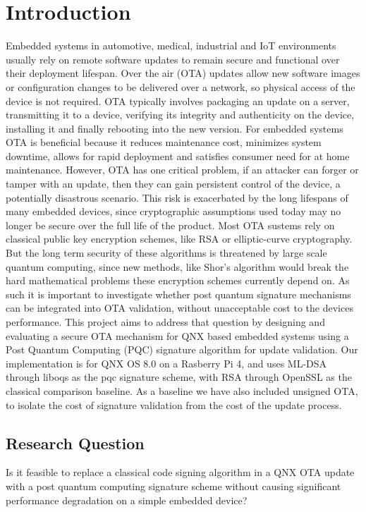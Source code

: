 \documentclass[12pt]{article}
\begin{document}
\section{Introduction}
Embedded systems in automotive, medical, industrial and IoT environments usually rely on remote software updates to remain secure and functional over their deployment lifespan. Over the air (OTA) updates allow new software images or configuration changes to be delivered over a network, so physical access of the device is not required. OTA typically involves packaging an update on a server, transmitting it to a device, verifying its integrity and authenticity on the device, installing it and finally rebooting into the new version. For embedded systems OTA is beneficial because it reduces maintenance cost, minimizes system downtime, allows for rapid deployment and satisfies consumer need for at home maintenance. However, OTA has one critical problem, if an attacker can forger or tamper with an update, then they can gain persistent control of the device, a potentially disastrous scenario. This risk is exacerbated by the long lifespans of many embedded devices, since cryptographic assumptions used today may no longer be secure over the full life of the product. Most OTA sustems rely on classical public key encryption schemes, like RSA or elliptic-curve cryptography. But the long term security of these algorithms is threatened by large scale quantum computing, since new methods, like Shor's algorithm would break the hard mathematical problems these encryption schemes currently depend on. As such it is important to investigate whether post quantum signature mechanisms can be integrated into OTA validation, without unacceptable cost to the devices performance. This project aims to address that question by designing and evaluating a secure OTA mechanism for QNX based embedded systems using a Post Quantum Computing (PQC) signature algorithm for update validation. Our implementation is for QNX OS 8.0 on a Rasberry Pi 4, and uses ML-DSA through liboqs as the pqc signature scheme, with RSA through OpenSSL as the classical comparison baseline. As a baseline we have also included unsigned OTA, to isolate the cost of signature validation from the cost of the update process. 
\subsection{Research Question}
Is it feasible to replace a classical code signing algorithm in a QNX OTA update with a post quantum computing signature scheme without causing significant performance degradation on a simple embedded device?
\end{document}
